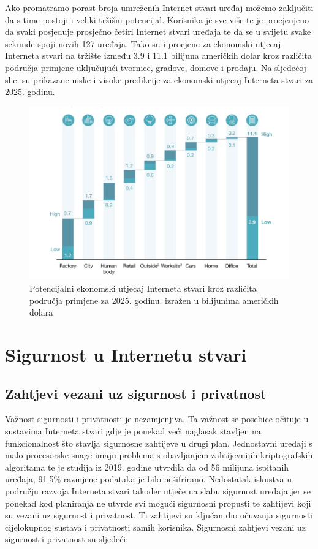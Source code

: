 \documentclass[times, utf8, diplomski]{fer}
\begin{document}
Ako promatramo porast broja umreženih Internet stvari uređaj možemo zaključiti da s time postoji i veliki tržišni potencijal. Korisnika je sve više te je procjenjeno da svaki posjeduje prosječno četiri Internet stvari uređaja te da se u svijetu svake sekunde spoji novih 127 uređaja. Tako su i procjene za ekonomski utjecaj Interneta stvari na tržište između 3.9 i 11.1 bilijuna američkih dolar kroz različita područja primjene uključujući tvornice, gradove, domove i prodaju\citep{Patel2018Jan}. Na sljedećoj slici su prikazane niske i visoke predikcije za ekonomski utjecaj Interneta stvari za 2025. godinu.
\begin{figure}[H]
    \centering
    \includegraphics[width=12cm]{images/iot-economic-impact.png}
    \caption{Potencijalni ekonomski utjecaj Interneta stvari kroz različita područja primjene za 2025. godinu. izražen u bilijunima američkih dolara\citep{Patel2018Jan}}
    \label{fig:market}
\end{figure}

\chapter{Sigurnost u Internetu stvari}
\section{Zahtjevi vezani uz sigurnost i privatnost}
Važnost sigurnosti i privatnosti je nezamjenjiva. Ta važnost se posebice očituje u sustavima Interneta stvari gdje je ponekad veći naglasak stavljen na funkcionalnost što stavlja sigurnosne zahtijeve u drugi plan. Jednostavni uređaji s malo procesorske snage imaju problema s obavljanjem zahtijevnijih kriptografskih algoritama te je studija iz 2019. godine utvrdila da od 56 milijuna ispitanih uređaja, 91.5\% razmjene podataka je bilo nešifrirano\citep{Greene2019May}. Nedostatak iskustva u području razvoja Interneta stvari također utječe na slabu sigurnost uređaja jer se ponekad kod planiranja ne utvrde svi mogući sigurnosni propusti te zahtijevi koji su vezani uz sigurnost i privatnost. Ti zahtijevi su ključan dio očuvanja sigurnosti cijelokupnog sustava i privatnosti samih korisnika. Sigurnosni zahtjevi vezani uz sigurnost i privatnost su sljedeći\citep{InternetStvari}:
\end{document}
